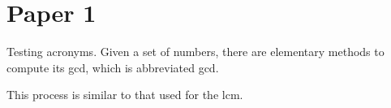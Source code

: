 \chapter{Paper 1}

Testing acronyms. Given a set of numbers, there are elementary methods to compute its \acrlong{gcd}, which is abbreviated \acrshort{gcd}. 

This process is similar to that used for the \acrfull{lcm}.